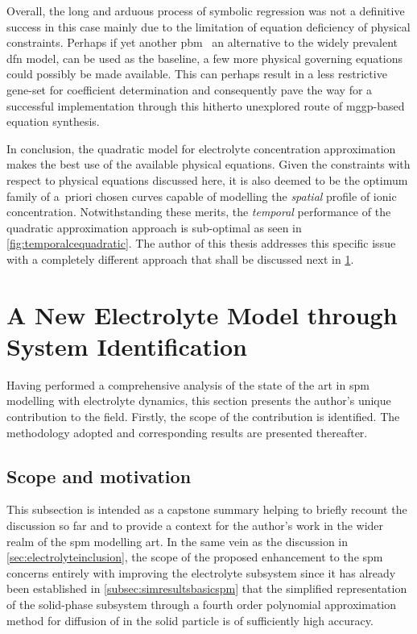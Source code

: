 Overall,  the  long  and  arduous  process of  symbolic  regression  was  not  a
definitive  success in  this  case  mainly due  to  the  limitation of  equation
deficiency  of physical  constraints. Perhaps  if yet  another \gls{pbm}  \ie~an
alternative  to  the widely  prevalent  \gls{dfn}  model,  can  be used  as  the
baseline,  a  few more  physical  governing  equations  could possibly  be  made
available.  This  can  perhaps  result   in  a  less  restrictive  gene-set  for
coefficient  determination  and  consequently  pave the  way  for  a  successful
implementation  through  this  hitherto  unexplored  route  of  \gls{mggp}-based
equation synthesis.

In conclusion,  the quadratic model for  electrolyte concentration approximation
makes the  best use of the  available physical equations. Given  the constraints
with  respect to  physical equations  discussed here,  it is  also deemed  to be
the  optimum  family  of  a~priori  chosen  curves  capable  of  modelling  the
\emph{spatial}  profile of  ionic concentration.  Notwithstanding these  merits,
the  \emph{temporal}  performance of  the  quadratic  approximation approach  is
sub-optimal as seen in \cref{fig:temporalcequadratic}. The author of this thesis
addresses this specific issue with a completely different approach that shall be
discussed next in \cref{sec:newelectrolytemodel}.

\section{A New Electrolyte Model through System Identification}\label{sec:newelectrolytemodel}

Having performed a  comprehensive analysis of the state of  the art in \gls{spm}
modelling with electrolyte  dynamics, this section presents  the author's unique
contribution to the field. Firstly, the scope of the contribution is identified.
The methodology adopted and corresponding results are presented thereafter.

\subsection{Scope and motivation}\label{subsec:scopenewelectrolyte}

This subsection is intended as a capstone summary helping to briefly recount the
discussion so far  and to provide a  context for the author's work  in the wider
realm  of the  \gls{spm}  modelling art.  In  the same  vein  as the  discussion
in \cref{sec:electrolyteinclusion}, the scope of the proposed enhancement to the
\gls{spm}  concerns  entirely with  improving  the  electrolyte subsystem  since
it  has already  been established  in \cref{subsec:simresultsbasicspm} that  the
simplified representation  of the solid-phase  subsystem through a  fourth order
polynomial approximation method for diffusion of  in the solid particle
is of sufficiently high accuracy.

